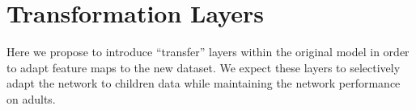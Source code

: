 
\section{Transformation Layers}
\label{sec:transfo}

Here we propose to introduce ``transfer'' layers within the original model in order to adapt feature maps to the new dataset. We expect these layers to selectively adapt the network to children data while maintaining the network performance on adults.



